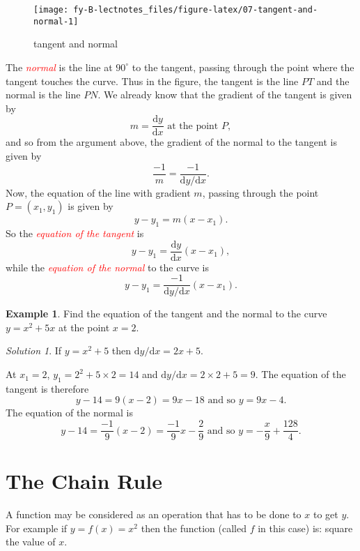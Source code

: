\documentclass[
  11pt,
  oneside]{book}
\newcommand{\slide}{}
\theoremstyle{definition}
\theoremstyle{definition}
\newtheorem{example}{Example}[chapter]
\theoremstyle{definition}
\theoremstyle{definition}
\theoremstyle{remark}
\newtheorem*{solution}{Solution}
\begin{document}
\begin{figure}

{\centering \texttt{[image: fy-B-lectnotes\_files/figure-latex/07-tangent-and-normal-1]} 

}

\caption{tangent and normal}\label{fig:07-tangent-and-normal}
\end{figure}

The \textcolor{red}{\em normal} is the line at \(90^\circ\) to the tangent, passing through the point where the tangent touches the curve. Thus in the figure, the tangent is the line \(PT\) and the normal is the line \(PN\). We already know that the gradient of the tangent is given by
\[
m = \frac{\mathrm{d} y}{\mathrm{d} x}\text{ at the point }P,
\]
and so from the argument above, the gradient of the normal to the tangent is given by
\[
\frac{-1}{m} = \frac{-1}{{\mathrm{d} y/\mathrm{d} x}}.
\]
Now, the equation of the line with gradient \(m\), passing through the point \(P=(x_1,y_1)\) is given by
\[
y-y_1 = m(x-x_1).
\]
So the \textcolor{red}{\em equation of the tangent} is
\[
y - y_1 = \frac{\mathrm{d} y}{\mathrm{d} x}(x-x_1),
\]
while the \textcolor{red}{\em equation of the normal} to the curve is
\[
y - y_1 = \frac{-1}{{\mathrm{d} y/\mathrm{d} x}}(x-x_1).
\]
\slide

\begin{example}
Find the equation of the tangent and the normal to the curve \(y = x^2+5x\) at the point \(x=2\).
\end{example}

\begin{solution}
If \(y=x^2+5\) then \({\mathrm{d} y/\mathrm{d} x} = 2x+5\).

At \(x_1=2\), \(y_1 = 2^2 + 5\times2 = 14\) and \({\mathrm{d} y/\mathrm{d} x} = 2\times2+5=9\).
The equation of the tangent is therefore
\[
y-14=9(x-2) = 9x - 18\text{ and so }y = 9x-4.
\]
The equation of the normal is
\[
y-14=\frac{-1}{9}(x-2) = \frac{-1}{9}x - \frac{2}{9}\text{ and so }y = -\frac{x}{9}+\frac{128}{4}.
\]
\end{solution}

\slide

\section{The Chain Rule}\label{lecture-five}

A function may be considered as an operation that has to be done to \(x\) to get \(y\). For example if \(y = f(x) = x^2\) then the function (called \(f\) in this case) is: square the value of \(x\).
\end{document}
